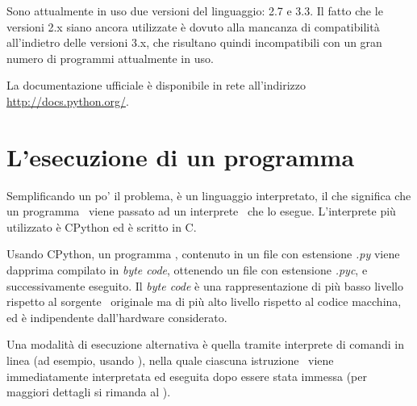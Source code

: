 Sono attualmente in uso due versioni del linguaggio: 2.7 e 3.3. Il fatto che le
versioni 2.x siano ancora utilizzate \`e dovuto alla mancanza di compatibilit\`a
all'indietro delle versioni 3.x, che risultano quindi incompatibili con un
gran numero di programmi attualmente in uso.

La documentazione ufficiale \`e disponibile in rete all'indirizzo
\url{http://docs.python.org/}.


\section{L'esecuzione di un programma \python}

Semplificando un po' il problema, \python \`e un linguaggio interpretato, il che
significa che un programma \python\ viene passato ad un interprete \python\ che
lo esegue. L'interprete pi\`u utilizzato \`e CPython ed \`e scritto in C.

Usando CPython, un programma \python, contenuto in un file con estensione
\emph{.py} viene dapprima compilato in \emph{byte code},
ottenendo un file con estensione \emph{.pyc}, e successivamente eseguito. Il
\emph{byte code} \`e una rappresentazione di pi\`u basso livello rispetto al
sorgente \python\ originale ma di pi\`u alto livello rispetto al codice
macchina, ed \`e indipendente dall'hardware considerato.

Una modalit\`a di esecuzione alternativa \`e quella tramite interprete di
comandi in linea (ad esempio, usando \ipython), nella quale ciascuna istruzione
\python\ viene immediatamente interpretata ed eseguita dopo essere stata immessa
(per maggiori dettagli si rimanda al ).

